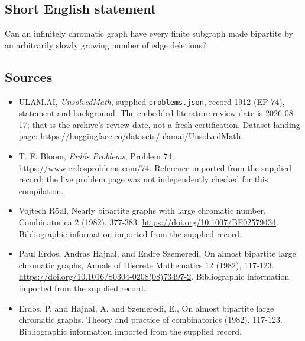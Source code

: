 \documentclass[11pt,a4paper]{article}
\begin{document}
\subsection{Short English statement}

Can an infinitely chromatic graph have every finite subgraph made bipartite by an arbitrarily slowly growing number of edge deletions?

\subsection{Sources}

{\small

\begin{itemize}

\item[\hypertarget{source:1912:1}{S1}] ULAM.AI, \emph{UnsolvedMath}, supplied \texttt{problems.json}, record 1912 (EP-74), statement and background. The embedded literature-review date is 2026-08-17; that is the archive’s review date, not a fresh certification. Dataset landing page: \url{https://huggingface.co/datasets/ulamai/UnsolvedMath}.

\item[\hypertarget{source:1912:2}{S2}] T. F. Bloom, \emph{Erdős Problems}, Problem 74, \url{https://www.erdosproblems.com/74}. Reference imported from the supplied record; the live problem page was not independently checked for this compilation.

\item[\hypertarget{source:1912:3}{S3}] Vojtech Rödl, Nearly bipartite graphs with large chromatic number, Combinatorica 2 (1982), 377-383. \url{https://doi.org/10.1007/BF02579434}. Bibliographic information imported from the supplied record.

\item[\hypertarget{source:1912:4}{S4}] Paul Erdos, Andras Hajnal, and Endre Szemeredi, On almost bipartite large chromatic graphs, Annals of Discrete Mathematics 12 (1982), 117-123. \url{https://doi.org/10.1016/S0304-0208(08)73497-2}. Bibliographic information imported from the supplied record.

\item[\hypertarget{source:1912:5}{S5}] Erd\H{o}s, P. and Hajnal, A. and Szemer\'{e}di, E., On almost bipartite large chromatic graphs. Theory and practice of combinatorics (1982), 117-123. Bibliographic information imported from the supplied record.

\end{itemize}

}

\label{end:1912}
\end{document}
